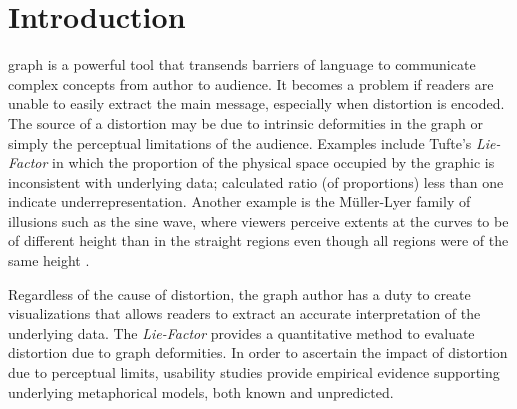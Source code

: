 

\section{Introduction}
% 
% 
% 
% 
 graph is a powerful tool 
that transends barriers of language to
communicate complex concepts from author to audience. It becomes a 
problem if readers are unable to easily extract the main message, especially
when distortion is encoded. The source of a distortion may be due to 
intrinsic deformities in the graph or simply the perceptual limitations of
the audience. Examples include Tufte's \emph{Lie-Factor} \cite[p. 57--69]{tufte} in which the proportion of the physical space occupied by the graphic is 
inconsistent with underlying data; calculated ratio (of proportions) less than one indicate 
underrepresentation. Another example is the M\"{u}ller-Lyer family of illusions such as the sine wave, where viewers perceive extents at the curves to be of different height than in the straight regions even though all regions were of the same height \cite{day:1991}.

Regardless of the cause of distortion, the graph author has a duty to create visualizations that
 allows readers to extract an accurate interpretation of the underlying data. The \emph{Lie-Factor}
provides a quantitative method to evaluate distortion due to graph deformities. In order to ascertain the
impact of distortion due to perceptual limits, usability studies provide empirical evidence supporting 
underlying metaphorical models, both known and unpredicted.  




